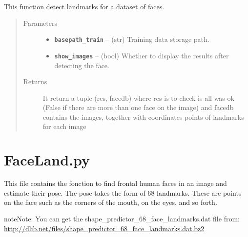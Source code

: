 \documentclass[letterpaper,10pt,english]{sphinxmanual}
\begin{document}

\begin{fulllineitems}
\label{Documentation of Code:extractFeaturesCoordinates.getFeatures}
This function detect landmarks for a dataset of faces.
\begin{quote}\begin{description}
\item[{Parameters}] \leavevmode\begin{itemize}
\item {} 
\textbf{\texttt{basepath\_train}} -- (str) Training data storage path.

\item {} 
\textbf{\texttt{show\_images}} -- (bool) Whether to display the results after detecting the face.

\end{itemize}

\item[{Returns}] \leavevmode
It return a tuple (res, facedb) where res is to check is all was ok (False if there are more than one face on the image) and facedb contains the images, together with coordinates points of landmarks for each image

\end{description}\end{quote}

\end{fulllineitems}



\section{FaceLand.py}
\label{Documentation of Code:module-FaceLand}\label{Documentation of Code:faceland-py}
This file contains the fonction to find frontal human faces in an image and estimate their pose.  The pose takes the form of 68 landmarks.  These are
points on the face such as the corners of the mouth, on the eyes, and so forth.

\begin{notice}{note}{Note:}
You can get the shape\_predictor\_68\_face\_landmarks.dat file from:
\url{http://dlib.net/files/shape\_predictor\_68\_face\_landmarks.dat.bz2}
\end{notice}
\end{document}
